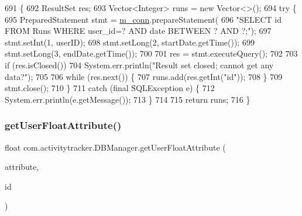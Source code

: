 \begin{DoxyCode}
691                                                                                                            
              \{
692         ResultSet res;
693         Vector<Integer> runs = \textcolor{keyword}{new} Vector<>();
694         \textcolor{keywordflow}{try} \{
695             PreparedStatement stmt = \mbox{\hyperlink{classcom_1_1activitytracker_1_1_d_b_manager_a064088d13ac09eb147fdc19268771521}{m\_conn}}.prepareStatement(
696                     \textcolor{stringliteral}{"SELECT id FROM Runs WHERE user\_id=? AND date BETWEEN ? AND ?;"});
697             stmt.setInt(1, userID);
698             stmt.setLong(2, startDate.getTime());
699             stmt.setLong(3, endDate.getTime());
700 
701             res = stmt.executeQuery();
702 
703             \textcolor{keywordflow}{if} (res.isClosed())
704                 System.err.println(\textcolor{stringliteral}{"Result set closed; cannot get any data?"});
705 
706             \textcolor{keywordflow}{while} (res.next()) \{
707                 runs.add(res.getInt(\textcolor{stringliteral}{"id"}));
708             \}
709             stmt.close();
710         \}
711         \textcolor{keywordflow}{catch} (\textcolor{keyword}{final} SQLException e) \{
712             System.err.println(e.getMessage());
713         \}
714 
715         \textcolor{keywordflow}{return} runs;
716     \}
\end{DoxyCode}
\mbox{\label{classcom_1_1activitytracker_1_1_d_b_manager_a98df66254bec4d74b29cfe468a9fc794}} 
\subsubsection{\texorpdfstring{get\+User\+Float\+Attribute()}{getUserFloatAttribute()}}
{\footnotesize\ttfamily float com.\+activitytracker.\+D\+B\+Manager.\+get\+User\+Float\+Attribute (\begin{DoxyParamCaption}\item[{final \mbox{\hyperlink{enumcom_1_1activitytracker_1_1_user_attribute}{User\+Attribute}}}]{attribute,  }\item[{final int}]{id }\end{DoxyParamCaption})}

